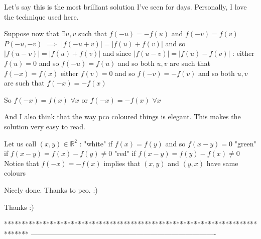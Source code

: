 


\begin{solution}
	Let's say this is the most brilliant solution I've seen for days.
Personally, I love the technique used here.
\begin{tcolorbox}
Suppose now that $\exists u,v$ such that $f(-u)=-f(u)$ and $f(-v)=f(v)$
$P(-u,-v)$ $\implies$ $|f(-u+v)|=|f(u)+f(v)|$ and so $|f(u-v)|=|f(u)+f(v)|$ and since $|f(u-v)|=|f(u)-f(v)|$ :
either $f(u)=0$ and so $f(-u)=f(u)$ and so both $u,v$ are such that $f(-x)=f(x)$
either $f(v)=0$ and so $f(-v)=-f(v)$ and so both $u,v$ are such that $f(-x)=-f(x)$

So $f(-x)=f(x)$ $\forall x$ or $f(-x)=-f(x)$ $\forall x$
\end{tcolorbox}

And I also think that the way pco coloured things is elegant.
This makes the solution very easy to read.

\begin{tcolorbox}
Let us call $(x,y)\in\mathbb R^2$ :
"white" if $f(x)=f(y)$ and so $f(x-y)=0$
"green" if $f(x-y)=f(x)-f(y)\ne 0$
"red" if $f(x-y)=f(y)-f(x)\ne 0$
Notice that $f(-x)=-f(x)$ implies that $(x,y)$ and $(y,x)$ have same colours
\end{tcolorbox}

Nicely done. Thanks to pco. :)
\end{solution}



\begin{solution}
	Thanks  :)
\end{solution}
*******************************************************************************
-------------------------------------------------------------------------------

